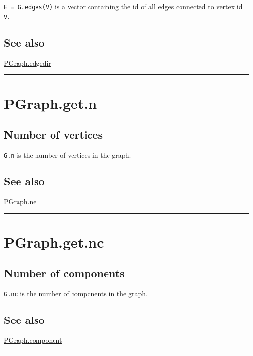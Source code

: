 \texttt{E = G.edges(V)} is a vector containing the id of all edges connected to vertex id \texttt{V}.


\subsection*{See also}


\hyperlink{PGraph.edgedir}{\color{blue} PGraph.edgedir}

\vspace{1.5ex}\hrule

\hypertarget{PGraph.get.n}{\section*{PGraph.get.n}}
\subsection*{Number of vertices}


\texttt{G.n} is the number of vertices in the graph.


\subsection*{See also}


\hyperlink{PGraph.ne}{\color{blue} PGraph.ne}

\vspace{1.5ex}\hrule

\hypertarget{PGraph.get.nc}{\section*{PGraph.get.nc}}
\subsection*{Number of components}


\texttt{G.nc} is the number of components in the graph.


\subsection*{See also}


\hyperlink{PGraph.component}{\color{blue} PGraph.component}

\vspace{1.5ex}\hrule

